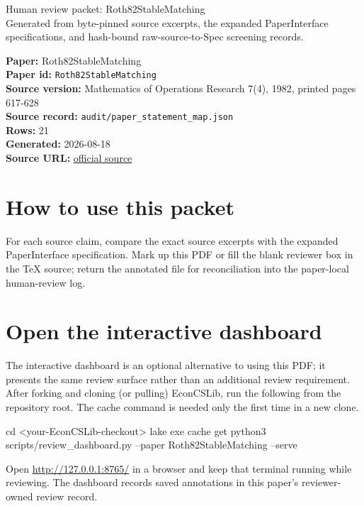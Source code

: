 \documentclass[10pt]{article}
\begin{document}
\fontsize{9}{10}\selectfont

\begin{center}
{\LARGE Human review packet: Roth82StableMatching}\\[0.35em]
\small Generated from byte-pinned source excerpts, the expanded PaperInterface
specifications, and hash-bound raw-source-to-Spec screening records.
\end{center}

\noindent\textbf{Paper:} Roth82StableMatching\\
\textbf{Paper id:} \texttt{Roth82StableMatching}\\
\textbf{Source version:} Mathematics of Operations Research 7(4), 1982, printed pages 617-628\\
\textbf{Source record:} \texttt{audit/paper\_statement\_map.json}\\
\textbf{Rows:} 21\\
\textbf{Generated:} 2026-08-18\\
\textbf{Source URL:} \href{https://doi.org/10.1287/moor.7.4.617}{official source}

\noindent{}\par



\section*{How to use this packet}
For each source claim, compare the exact source excerpts with the expanded
PaperInterface specification. Mark up this PDF or fill the blank reviewer box in the TeX source;
return the annotated file for reconciliation into the paper-local human-review
log.

\section*{Open the interactive dashboard}
The interactive dashboard is an optional alternative to using this PDF; it
presents the same review surface rather than an additional review requirement.
After forking and cloning (or pulling) EconCSLib, run the following from the
repository root. The cache command is needed only the first time in a new clone.
\begin{ReviewVerbatim}
cd <your-EconCSLib-checkout>
lake exe cache get
python3 scripts/review_dashboard.py --paper Roth82StableMatching --serve
\end{ReviewVerbatim}
Open \url{http://127.0.0.1:8765/} in a browser and keep that terminal running
while reviewing. The dashboard records saved annotations in this paper's
reviewer-owned review record.
\end{document}
